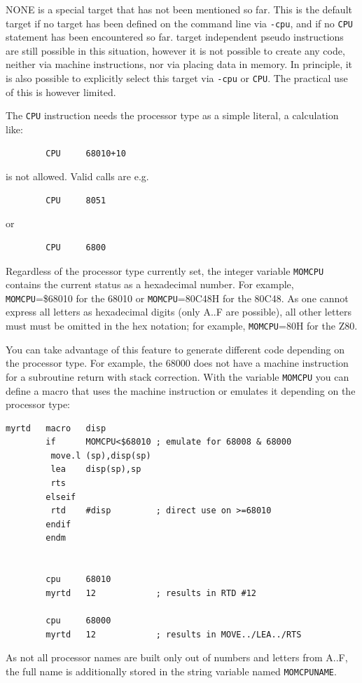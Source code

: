 \documentclass[12pt,twoside]{report}
\newcommand{\tty}[1]{{\tt #1}}
\begin{document}
NONE is a special target that has not been mentioned so far.  This is the
default target if no target has been defined on the command line via
{\tt -cpu}, and if no {\tt CPU} statement has been encountered so far.
target independent pseudo instructions are still possible in this situation,
however it is not possible to create any code, neither via machine
instructions, nor via placing data in memory.  In principle, it is
also possible to explicitly select this target via {\tt -cpu} or
{\tt CPU}.  The practical use of this is however limited.

The \tty{CPU} instruction needs the processor type as a simple literal, a
calculation like:
\begin{verbatim}
        CPU     68010+10
\end{verbatim}
is not allowed.  Valid calls are e.g.
\begin{verbatim}
        CPU     8051
\end{verbatim}
or
\begin{verbatim}
        CPU     6800
\end{verbatim}
Regardless of the processor type currently set, the integer variable
\tty{MOMCPU} contains the current status as a hexadecimal number.  For
example, \tty{MOMCPU}=\$68010 for the 68010 or \tty{MOMCPU}=80C48H for the
80C48.  As one cannot express all letters as hexadecimal digits (only A..F
are possible), all other letters must must be omitted in the hex notation;
for example, \tty{MOMCPU}=80H for the Z80.

You can take advantage of this feature to generate different code
depending on the processor type.  For example, the 68000 does not have a
machine instruction for a subroutine return with stack correction.  With
the variable \tty{MOMCPU} you can define a macro that uses the machine
instruction or emulates it depending on the processor type:
\begin{verbatim}
myrtd   macro   disp
        if      MOMCPU<$68010 ; emulate for 68008 & 68000
         move.l (sp),disp(sp)
         lea    disp(sp),sp
         rts
        elseif
         rtd    #disp         ; direct use on >=68010
        endif
        endm


        cpu     68010
        myrtd   12            ; results in RTD #12

        cpu     68000
        myrtd   12            ; results in MOVE../LEA../RTS
\end{verbatim}
As not all processor names are built only out of numbers and letters
from A..F, the full name is additionally stored in the string
variable named \tty{MOMCPUNAME}.
\end{document}
